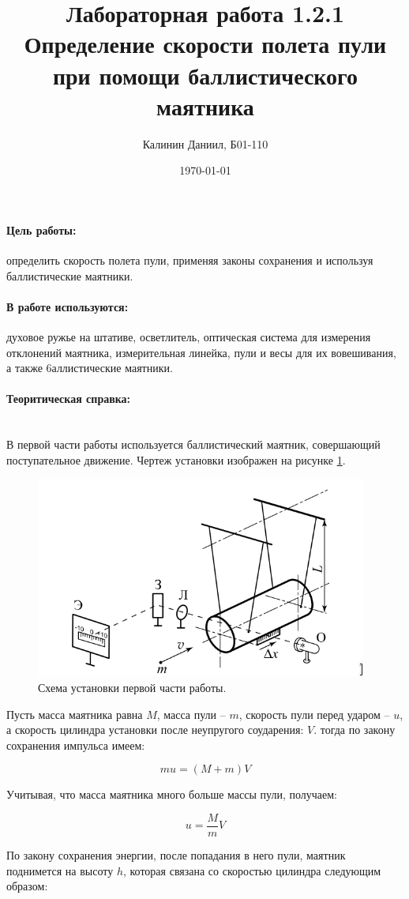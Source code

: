 \documentclass[a4paper, 12pt]{article}
\author{Калинин Даниил, Б01-110}
\date{\today}
\title{Лабораторная работа 1.2.1\\Определение скорости полета пули при помощи баллистического маятника}
\newcommand{\parag}[1]{\paragraph*{#1:}}
\begin{document}
\maketitle

\parag {Цель работы}
определить скорость полета пули, применяя законы
сохранения и используя баллистические маятники.
   
\parag {В работе используются}
духовое ружье на штативе, осветлитель, оптическая система для измерения отклонений маятника, измерительная линейка, пули и весы для их вовешивания, а также 6аллистические маятники.

\parag {Теоритическая справка} ~\\
В первой части работы используется баллистический маятник, совершающий поступательное движение. Чертеж установки изображен на рисунке \ref{pic:pend1}.

\begin{figure}[H]
    \centering
    \includegraphics[width=0.8\linewidth]{pendulum1.png}
    \caption{Схема установки первой части работы.}
    \label{pic:pend1}
\end{figure}

Пусть масса маятника равна $M$, масса пули -- $m$, скорость пули перед ударом -- $u$, а скорость цилиндра установки после неупругого соударения: $V$. тогда по закону сохранения импульса имеем:

\begin{equation}
    mu = \left(M + m\right) V    
\end{equation}

Учитывая, что масса маятника много больше массы пули, получаем:

\begin{equation}
    u = \frac{M}{m}V
\end{equation}

По закону сохранения энергии, после попадания в него пули, маятник поднимется на высоту $h$, которая связана со скоростью цилиндра следующим образом:
\end{document}
